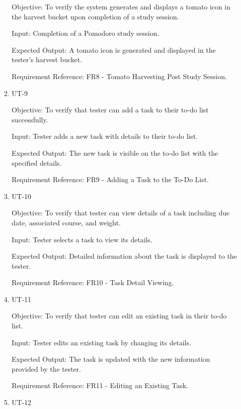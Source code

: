 \documentclass[12pt, titlepage]{article}
\begin{document}
\begin{enumerate}
\begin{enumerate}
        Objective: To verify the system generates and displays a tomato icon in the harvest bucket upon completion of a study session.
        
        Input: Completion of a Pomodoro study session.
        
        Expected Output: A tomato icon is generated and displayed in the tester's harvest bucket.
        
        Requirement Reference: FR8 - Tomato Harvesting Post Study Session.
        
    \item{UT-9\\}\label{UT-9}
    
        Objective: To verify that tester can add a task to their to-do list successfully.
        
        Input: Tester adds a new task with details to their to-do list.
        
        Expected Output: The new task is visible on the to-do list with the specified details.
        
        Requirement Reference: FR9 - Adding a Task to the To-Do List.
        
    \item{UT-10\\}\label{UT-10}
    
        Objective: To verify that tester can view details of a task including due date, associated course, and weight.
        
        Input: Tester selects a task to view its details.
        
        Expected Output: Detailed information about the task is displayed to the tester.
        
        Requirement Reference: FR10 - Task Detail Viewing.
        
    \item{UT-11\\}\label{UT-11}
    
        Objective: To verify that tester can edit an existing task in their to-do list.
        
        Input: Tester edits an existing task by changing its details.
        
        Expected Output: The task is updated with the new information provided by the tester.
        
        Requirement Reference: FR11 - Editing an Existing Task.
        
    \item{UT-12\\}\label{UT-12}
    

\end{enumerate}
\end{enumerate}
\end{document}
